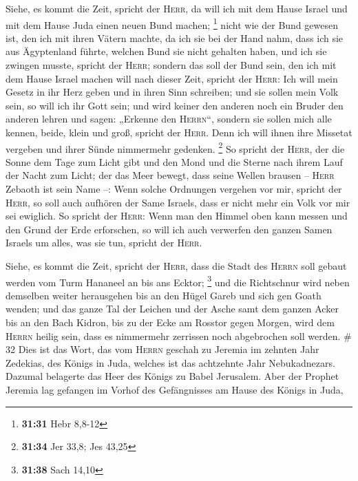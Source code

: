 Siehe, es kommt die Zeit, spricht der \textsc{Herr}, da
will ich mit dem Hause Israel und mit dem Hause Juda einen neuen Bund
machen; \footnote{\textbf{31:31} Hebr 8,8-12}  nicht wie
der Bund gewesen ist, den ich mit ihren Vätern machte, da ich sie bei
der Hand nahm, dass ich sie aus Ägyptenland führte, welchen Bund sie
nicht gehalten haben, und ich sie zwingen musste, spricht der
\textsc{Herr};  sondern das soll der Bund sein, den ich
mit dem Hause Israel machen will nach dieser Zeit, spricht der
\textsc{Herr}: Ich will mein Gesetz in ihr Herz geben und in ihren Sinn
schreiben; und sie sollen mein Volk sein, so will ich ihr Gott sein;
 und wird keiner den anderen noch ein Bruder den anderen
lehren und sagen: „Erkenne den \textsc{Herrn}``, sondern sie sollen mich
alle kennen, beide, klein und groß, spricht der \textsc{Herr}. Denn ich
will ihnen ihre Missetat vergeben und ihrer Sünde nimmermehr gedenken.
\footnote{\textbf{31:34} Jer 33,8; Jes 43,25}  So spricht
der \textsc{Herr}, der die Sonne dem Tage zum Licht gibt und den Mond
und die Sterne nach ihrem Lauf der Nacht zum Licht; der das Meer bewegt,
dass seine Wellen brausen -- \textsc{Herr} Zebaoth ist sein Name --:
 Wenn solche Ordnungen vergehen vor mir, spricht der
\textsc{Herr}, so soll auch aufhören der Same Israels, dass er nicht
mehr ein Volk vor mir sei ewiglich.  So spricht der
\textsc{Herr}: Wenn man den Himmel oben kann messen und den Grund der
Erde erforschen, so will ich auch verwerfen den ganzen Samen Israels um
alles, was sie tun, spricht der \textsc{Herr}.

 Siehe, es kommt die Zeit, spricht der \textsc{Herr},
dass die Stadt des \textsc{Herrn} soll gebaut werden vom Turm Hananeel
an bis ans Ecktor; \footnote{\textbf{31:38} Sach 14,10} 
und die Richtschnur wird neben demselben weiter herausgehen bis an den
Hügel Gareb und sich gen Goath wenden;  und das ganze Tal
der Leichen und der Asche samt dem ganzen Acker bis an den Bach Kidron,
bis zu der Ecke am Rosstor gegen Morgen, wird dem \textsc{Herrn} heilig
sein, dass es nimmermehr zerrissen noch abgebrochen soll werden. \# 32
 Dies ist das Wort, das vom \textsc{Herrn} geschah zu
Jeremia im zehnten Jahr Zedekias, des Königs in Juda, welches ist das
achtzehnte Jahr Nebukadnezars.  Dazumal belagerte das Heer
des Königs zu Babel Jerusalem. Aber der Prophet Jeremia lag gefangen im
Vorhof des Gefängnisses am Hause des Königs in Juda,

